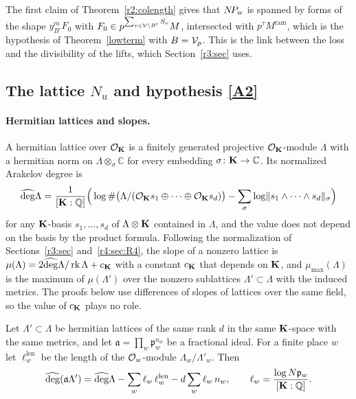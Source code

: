 The first claim of Theorem~\ref{r2:colength} gives that $N\!P_w$ is spanned by forms of the shape $y_{B'}^mF_0$ with $F_0\in p^{\sum_{v\in\mathcal V\setminus B'}S_v}M$, intersected with $p^{\tau}M^{\mathrm{ram}}$, which is the hypothesis of Theorem~\ref{lowterm} with $B=\mathcal V_p$. This is the link between the loss and the divisibility of the lifts, which Section~\ref{r3:sec} uses.
\subsection{The lattice \texorpdfstring{$N_u$}{N\_u} and hypothesis \texorpdfstring{\eqref{A2}}{(A2)}}\label{r2:sec:Nu}

\paragraph{Hermitian lattices and slopes.} A hermitian lattice over $\mathcal O_\mathbf K$ is a finitely generated projective $\mathcal O_\mathbf K$-module $\Lambda$ with a hermitian norm on $\Lambda\otimes_{\sigma}\mathbb C$ for every embedding $\sigma\colon\mathbf K\to\mathbb C$. Its normalized Arakelov degree is
\[
\widehat{\deg}\Lambda=\frac1{[\mathbf K:\mathbb Q]}\Big(\log\#\big(\Lambda/(\mathcal O_\mathbf K s_1\oplus\dots\oplus\mathcal O_\mathbf K s_d)\big)-\sum_\sigma\log\lVert s_1\wedge\dots\wedge s_d\rVert_\sigma\Big)
\]
for any $\mathbf K$-basis $s_1,\dots,s_d$ of $\Lambda\otimes\mathbf K$ contained in $\Lambda$, and the value does not depend on the basis by the product formula. Following the normalization of Sections~\ref{r3:sec} and~\ref{r4:sec:R4}, the slope of a nonzero lattice is $\mu(\Lambda)=2\widehat{\deg}\Lambda/\operatorname{rk}\Lambda+c_\mathbf K$ with a constant $c_\mathbf K$ that depends on $\mathbf K$, and $\mu_{\max}(\Lambda)$ is the maximum of $\mu(\Lambda')$ over the nonzero sublattices $\Lambda'\subset\Lambda$ with the induced metrics. The proofs below use differences of slopes of lattices over the same field, so the value of $c_\mathbf K$ plays no role.

\begin{lemma}\label{r2:degree}
Let $\Lambda'\subset\Lambda$ be hermitian lattices of the same rank $d$ in the same $\mathbf K$-space with the same metrics, and let $\mathfrak a=\prod_w\mathfrak p_w^{n_w}$ be a fractional ideal. For a finite place $w$ let $\ell^{\mathrm{len}}_w$ be the length of the $\mathcal O_w$-module $\Lambda_w/\Lambda'_w$. Then
\[
\widehat{\deg}(\mathfrak a\Lambda')=\widehat{\deg}\Lambda-\sum_w\ell_w\,\ell^{\mathrm{len}}_w-d\sum_w\ell_w\,n_w,\qquad \ell_w=\frac{\log N\mathfrak p_w}{[\mathbf K:\mathbb Q]} .
\]
\end{lemma}

